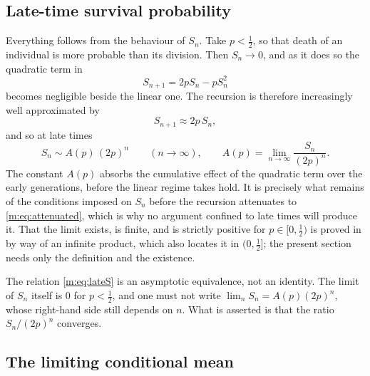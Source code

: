 \subsection{Late-time survival probability}
\label{m:sec:lateS}

Everything follows from the behaviour of $S_n$. Take $p<\tfrac12$, so that death of
an individual is more probable than its division. Then $S_n\to0$, and as it does so
the quadratic term in
\begin{equation*}
S_{n+1} = 2pS_n - pS_n^2
\end{equation*}
becomes negligible beside the linear one. The recursion is therefore increasingly
well approximated by
\begin{equation}
\label{m:eq:attenuated}
S_{n+1}\approx 2p\,S_n ,
\end{equation}
and so at late times
\begin{equation}
\label{m:eq:lateS}
S_n \sim A(p)\,(2p)^n\qquad(n\to\infty),
\qquad
A(p) = \lim_{n\to\infty}\frac{S_n}{(2p)^n} .
\end{equation}
The constant $A(p)$ absorbs the cumulative effect of the quadratic term over the
early generations, before the linear regime takes hold. It is precisely what
remains of the conditions imposed on $S_n$ before the recursion attenuates to
\cref{m:eq:attenuated}, which is why no argument confined to late times will produce
it. That the limit exists, is finite, and is strictly positive for
$p\in[0,\tfrac12)$ is proved in \ChA{} by way of an infinite product, which also
locates it in $(0,\tfrac12]$; the present section needs only the definition and the
existence.

\begin{remark}
\label{m:rem:asympnotidentity}
The relation \cref{m:eq:lateS} is an asymptotic equivalence, not an identity. The
limit of $S_n$ itself is $0$ for $p<\tfrac12$, and one must not write
$\lim_n S_n = A(p)(2p)^n$, whose right-hand side still depends on $n$. What is
asserted is that the ratio $S_n/(2p)^n$ converges.
\end{remark}

\subsection{The limiting conditional mean}
\label{m:sec:condmean}

